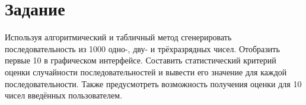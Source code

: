 \chapter*{Задание}

Используя алгоритмический и табличный метод сгенерировать последовательность из 1000 одно-, дву- и трёхразрядных чисел. Отобразить первые 10 в графическом интерфейсе. Составить статистический критерий оценки случайности последовательностей и вывести его значение для каждой последовательности. Также предусмотреть возможность получения оценки для 10 чисел введённых пользователем. 